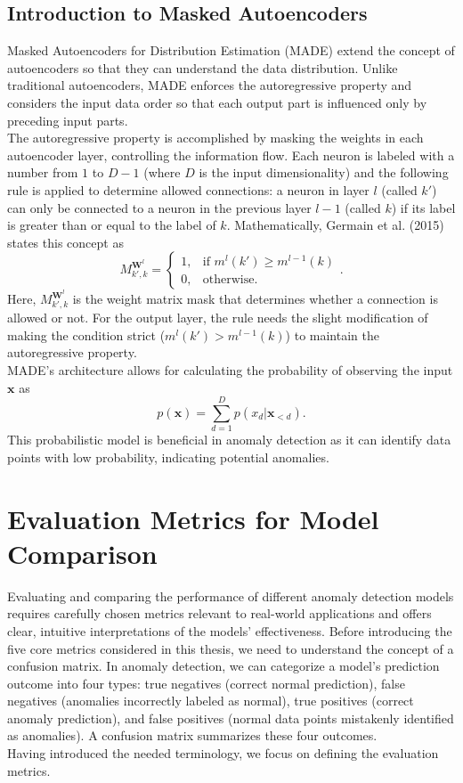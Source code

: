 \subsection{Introduction to Masked Autoencoders}
\label{theory:made}
Masked Autoencoders for Distribution Estimation (MADE) extend the concept of autoencoders so that they can understand the data distribution. Unlike traditional autoencoders, MADE enforces the autoregressive property and considers the input data order so that each output part is influenced only by preceding input parts.\\
The autoregressive property is accomplished by masking the weights in each autoencoder layer, controlling the information flow. Each neuron is labeled with a number from $1$ to $D-1$ (where $D$ is the input dimensionality) and the following rule is applied to determine allowed connections: a neuron in layer $l$ (called $k'$) can only be connected to a neuron in the previous layer $l-1$ (called $k$) if its label is greater than or equal to the label of $k$. Mathematically, Germain et al. (2015) states this concept as
\[ M^{\mathbf{W}^l}_{k',k}=\begin{cases}
    1, & \text{if } m^l(k')\geq m^{l-1}(k) \\
    0, & \text{otherwise.}
  \end{cases} .\]
Here, $M^{\mathbf{W}^l}_{k',k}$ is the weight matrix mask that determines whether a connection is allowed or not. For the output layer, the rule needs the slight modification of making the condition strict ($m^l(k')> m^{l-1}(k)$) to maintain the autoregressive property.\\
MADE's architecture allows for calculating the probability of observing the input $\mathbf{x}$ as
\[ p(\mathbf{x}) = \sum_{d=1}^{D} p(x_d | \mathbf{x}_{<d}) .\]
This probabilistic model is beneficial in anomaly detection as it can identify data points with low probability, indicating potential anomalies.


\section{Evaluation Metrics for Model Comparison}
Evaluating and comparing the performance of different anomaly detection models requires carefully chosen metrics relevant to real-world applications and offers clear, intuitive interpretations of the models' effectiveness. Before introducing the five core metrics considered in this thesis, we need to understand the concept of a confusion matrix.
In anomaly detection, we can categorize a model's prediction outcome into four types: true negatives (correct normal prediction), false negatives (anomalies incorrectly labeled as normal), true positives (correct anomaly prediction), and false positives (normal data points mistakenly identified as anomalies). A confusion matrix summarizes these four outcomes.\\
Having introduced the needed terminology, we focus on defining the evaluation metrics.

